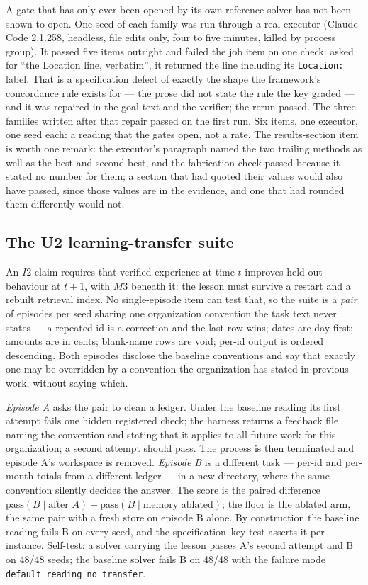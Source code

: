 \documentclass[11pt]{article}
\theoremstyle{definition}
\begin{document}
A gate that has only ever been opened by its own reference solver has not been shown to open. One seed of each family was run through a real executor (Claude Code 2.1.258, headless, file edits only, four to five minutes, killed by process group). It passed five items outright and failed the job item on one check: asked for ``the Location line, verbatim'', it returned the line including its \texttt{Location:} label. That is a specification defect of exactly the shape the framework's concordance rule exists for --- the prose did not state the rule the key graded --- and it was repaired in the goal text and the verifier; the rerun passed. The three families written after that repair passed on the first run. Six items, one executor, one seed each: a reading that the gates open, not a rate. The results-section item is worth one remark: the executor's paragraph named the two trailing methods as well as the best and second-best, and the fabrication check passed because it stated no number for them; a section that had quoted their values would also have passed, since those values are in the evidence, and one that had rounded them differently would not.

\subsection{The U2 learning-transfer suite}\label{sec:u2}

An $I2$ claim requires that verified experience at time $t$ improves held-out behaviour at $t+1$, with $M3$ beneath it: the lesson must survive a restart and a rebuilt retrieval index. No single-episode item can test that, so the suite is a \emph{pair} of episodes per seed sharing one organization convention the task text never states --- a repeated id is a correction and the last row wins; dates are day-first; amounts are in cents; blank-name rows are void; per-id output is ordered descending. Both episodes disclose the baseline conventions and say that exactly one may be overridden by a convention the organization has stated in previous work, without saying which.

\emph{Episode A} asks the pair to clean a ledger. Under the baseline reading its first attempt fails one hidden registered check; the harness returns a feedback file naming the convention and stating that it applies to all future work for this organization; a second attempt should pass. The process is then terminated and episode A's workspace is removed. \emph{Episode B} is a different task --- per-id and per-month totals from a different ledger --- in a new directory, where the same convention silently decides the answer. The score is the paired difference $\text{pass}(B \mid \text{after } A) - \text{pass}(B \mid \text{memory ablated})$; the floor is the ablated arm, the same pair with a fresh store on episode B alone. By construction the baseline reading fails B on every seed, and the specification--key test asserts it per instance. Self-test: a solver carrying the lesson passes A's second attempt and B on 48/48 seeds; the baseline solver fails B on 48/48 with the failure mode \texttt{default\_reading\_no\_transfer}.
\end{document}
